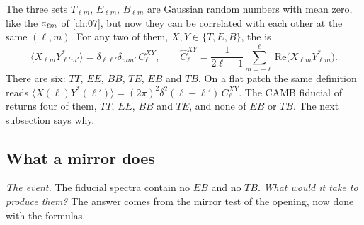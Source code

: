 The three sets $T_{\ell m}$, $E_{\ell m}$, $B_{\ell m}$ are Gaussian random numbers with mean zero, like the $a_{\ell m}$ of \cref{ch:07}, but now they can be correlated with each other at the same $(\ell,m)$. For any two of them, $X,Y\in\{T,E,B\}$, the  is
\begin{equation}
\langle X_{\ell m}Y^*_{\ell'm'}\rangle=\delta_{\ell\ell'}\delta_{mm'}\,C_\ell^{XY},
\qquad
\widehat C_\ell^{XY}=\frac{1}{2\ell+1}\sum_{m=-\ell}^{\ell}\mathrm{Re}\bigl(X_{\ell m}Y^*_{\ell m}\bigr).
\label{T1c:eq:spectra}
\end{equation}
There are six: $TT$, $EE$, $BB$, $TE$, $EB$ and $TB$. On a flat patch the same definition reads $\langle X(\bm\ell)Y^*(\bm\ell')\rangle=(2\pi)^2\delta^2(\bm\ell-\bm\ell')\,C^{XY}_\ell$. The CAMB fiducial of  returns four of them, $TT$, $EE$, $BB$ and $TE$, and none of $EB$ or $TB$. The next subsection says why.

\subsection{What a mirror does}
\label{T1c:sec:parity}

\emph{The event.} The fiducial spectra contain no $EB$ and no $TB$. \emph{What would it take to produce them?} The answer comes from the mirror test of the opening, now done with the formulas.

